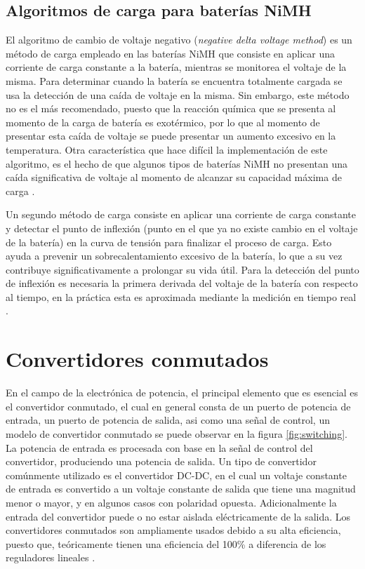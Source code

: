 \subsection{Algoritmos de carga para baterías NiMH}

El algoritmo de cambio de voltaje negativo (\textit{negative delta voltage method}) es un método de carga empleado
en las baterías NiMH que consiste en aplicar una corriente de carga constante a la batería, mientras se monitorea 
el voltaje de la misma. Para determinar cuando la batería se encuentra totalmente cargada se usa la detección de una 
caída de voltaje en la misma. Sin embargo, este método no es el más recomendado, puesto que la reacción química que se 
presenta al momento de la carga de batería es exotérmico, por lo que al momento de presentar esta caída de voltaje se 
puede presentar un aumento excesivo en la temperatura. Otra característica que hace difícil la implementación de este 
algoritmo, es el hecho de que algunos tipos de baterías NiMH no presentan una caída significativa de voltaje al momento
de alcanzar su capacidad máxima de carga \cite{nicolai_nickel-cadmium_1995}.

Un segundo método de carga consiste en aplicar una corriente de carga constante y 
detectar el punto de inflexión (punto en el que ya no existe cambio
en el voltaje de la batería) en la curva de tensión para finalizar el proceso de carga.
Esto ayuda a prevenir un sobrecalentamiento
excesivo de la batería, lo que a su vez contribuye significativamente a prolongar su vida útil. 
Para la detección del punto de inflexión es necesaria la primera derivada del voltaje de la batería con respecto 
al tiempo, en la práctica esta es aproximada mediante la medición en tiempo real \cite{nicolai_nickel-cadmium_1995}.

\section{Convertidores conmutados}

En el campo de la electrónica de potencia, el principal elemento que es esencial es el convertidor conmutado, el cual
en general consta de un puerto de potencia de entrada, un puerto de potencia de salida, asi como una señal de control,
un modelo de convertidor conmutado se puede observar en la figura \ref{fig:switching}. La potencia de entrada es procesada
con base en la señal de control del convertidor, produciendo una potencia de salida. Un tipo de convertidor comúnmente utilizado
es el convertidor DC-DC, en el cual un voltaje constante de entrada es convertido a un voltaje constante de salida que tiene 
una magnitud menor o mayor, y en algunos casos con polaridad opuesta. Adicionalmente la entrada del convertidor puede o no estar  aislada eléctricamente de la salida. Los convertidores conmutados son
ampliamente usados debido a su alta eficiencia, puesto que, teóricamente tienen una eficiencia del 
100\% a diferencia de los reguladores lineales \cite{erickson_fundamentals_2020}.

